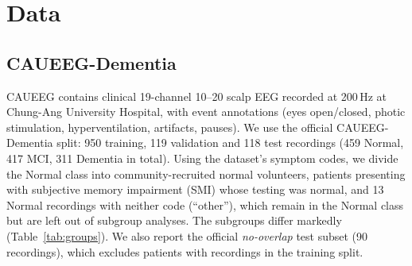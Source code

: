 \documentclass[conference]{IEEEtran}
\begin{document}
\section{Data}
\label{sec:data}

\subsection{CAUEEG-Dementia}
CAUEEG \cite{kim2023caueeg} contains clinical 19-channel 10--20 scalp EEG recorded at 200\,Hz at
Chung-Ang University Hospital, with event annotations (eyes open/closed, photic stimulation,
hyperventilation, artifacts, pauses). We use the official CAUEEG-Dementia split: 950 training,
119 validation and 118 test recordings (459 Normal, 417 MCI, 311 Dementia in total). Using the
dataset's symptom codes, we divide the Normal class into community-recruited normal volunteers,
patients presenting with subjective memory impairment (SMI) whose testing was normal, and 13
Normal recordings with neither code (``other''), which remain in the Normal class but are left out of
subgroup analyses. The subgroups differ markedly (Table~\ref{tab:groups}). We also report the
official \textit{no-overlap} test subset (90 recordings), which excludes patients with recordings in
the training split.

\begin{table}[t]
\centering
\caption{CAUEEG-Dementia subgroups (all 1,187 recordings). Durations are clean minutes per recording
after artifact masking.}
\label{tab:groups}
\end{table}
\end{document}
